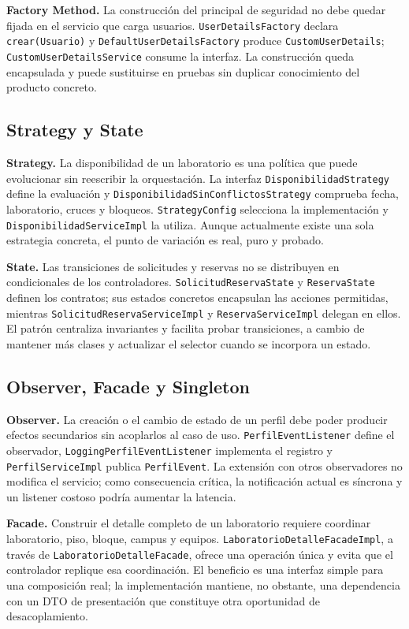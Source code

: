 \textbf{Factory Method.} La construcción del principal de seguridad no debe
quedar fijada en el servicio que carga usuarios. \texttt{UserDetailsFactory}
declara \texttt{crear(Usuario)} y \texttt{DefaultUserDetailsFactory} produce
\texttt{CustomUserDetails}; \texttt{CustomUserDetailsService} consume la
interfaz. La construcción queda encapsulada y puede sustituirse en pruebas sin
duplicar conocimiento del producto concreto.

\subsection{Strategy y State}

\textbf{Strategy.} La disponibilidad de un laboratorio es una política que
puede evolucionar sin reescribir la orquestación. La interfaz
\texttt{DisponibilidadStrategy} define la evaluación y
\texttt{DisponibilidadSinConflictosStrategy} comprueba fecha, laboratorio,
cruces y bloqueos. \texttt{StrategyConfig} selecciona la implementación y
\texttt{DisponibilidadServiceImpl} la utiliza. Aunque actualmente existe una
sola estrategia concreta, el punto de variación es real, puro y probado.

\textbf{State.} Las transiciones de solicitudes y reservas no se distribuyen en
condicionales de los controladores. \texttt{SolicitudReservaState} y
\texttt{ReservaState} definen los contratos; sus estados concretos encapsulan
las acciones permitidas, mientras \texttt{SolicitudReservaServiceImpl} y
\texttt{ReservaServiceImpl} delegan en ellos. El patrón centraliza invariantes y
facilita probar transiciones, a cambio de mantener más clases y actualizar el
selector cuando se incorpora un estado.

\subsection{Observer, Facade y Singleton}

\textbf{Observer.} La creación o el cambio de estado de un perfil debe poder
producir efectos secundarios sin acoplarlos al caso de uso.
\texttt{PerfilEventListener} define el observador,
\texttt{LoggingPerfilEventListener} implementa el registro y
\texttt{PerfilServiceImpl} publica \texttt{PerfilEvent}. La extensión con otros
observadores no modifica el servicio; como consecuencia crítica, la notificación
actual es síncrona y un listener costoso podría aumentar la latencia.

\textbf{Facade.} Construir el detalle completo de un laboratorio requiere
coordinar laboratorio, piso, bloque, campus y equipos.
\texttt{LaboratorioDetalleFacadeImpl}, a través de
\texttt{LaboratorioDetalleFacade}, ofrece una operación única y evita que el
controlador replique esa coordinación. El beneficio es una interfaz simple para
una composición real; la implementación mantiene, no obstante, una dependencia
con un DTO de presentación que constituye otra oportunidad de desacoplamiento.


